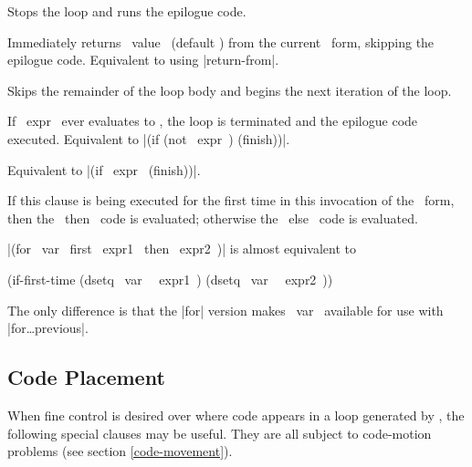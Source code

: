 \begin{clauses}

Stops the loop and runs the epilogue code.

%
%

Immediately returns ~value~ (default \nil) from the current \iter\
form, skipping the epilogue code.  Equivalent to using |return-from|.

Skips the remainder of the loop body and begins the next iteration of
the loop.

If ~expr~ ever evaluates to \nil, the loop is terminated and the
epilogue code executed.  Equivalent to |(if (not ~expr~) (finish))|.

Equivalent to |(if ~expr~ (finish))|.

If this clause is being executed for the first time in this invocation
of the \iter\ form, then the ~then~ code is evaluated; otherwise the
~else~ code is evaluated.

\cpar |(for ~var~ first ~expr1~ then ~expr2~)| is almost equivalent to
\begin{program}
(if-first-time (dsetq ~var~ ~expr1~)
               (dsetq ~var~ ~expr2~))
\end{program}
The only difference is that the |for| version makes ~var~ available
for use with |for\dots previous|.

\end{clauses}

\subsection{Code Placement}
When fine control is desired over where code appears in a loop
generated by \iter, the following special clauses may be useful.
They are all subject to code-motion problems (see section
\ref{code-movement}).  

